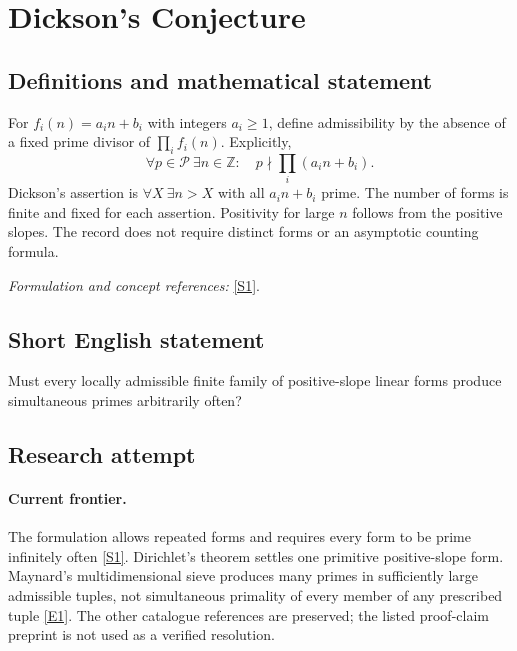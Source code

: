 \documentclass[11pt,a4paper]{article}
\newcommand{\Z}{\mathbb{Z}}
\newcommand{\sref}[2]{\hyperlink{source:#1:#2}{[S#2]}}
\newcommand{\eref}[2]{\hyperlink{extra:#1:#2}{[E#2]}}
\newif\ifshowcatalogue
\newcommand{\cataloguescope}[1]{\ifshowcatalogue
 \paragraph{Exact scope in the supplied catalogue.}
 \begin{quote}\small #1\end{quote}\fi}
\numberwithin{equation}{section}
\begin{document}
\setcounter{section}{0}
\clearpage
\section*{\texorpdfstring{Dickson's Conjecture}{Dickson's Conjecture}}\label{statement}
\subsection{Definitions and mathematical statement}
For $f_i(n)=a_in+b_i$ with integers $a_i\ge1$, define admissibility by the absence of a fixed prime divisor of $\prod_i f_i(n)$. Explicitly,
\[
 \forall p\in\mathcal P\ \exists n\in\Z:\quad p\nmid\prod_i(a_in+b_i).
\]
Dickson's assertion is $\forall X\ \exists n>X$ with all $a_in+b_i$ prime. The number of forms is finite and fixed for each assertion. Positivity for large $n$ follows from the positive slopes. The record does not require distinct forms or an asymptotic counting formula.
\par\smallskip\textit{Formulation and concept references:} \sref{statement}{1}.
\cataloguescope{For every integer k>=1 and every family f\_i(n)=a\_i*n+b\_i (1<=i<=k) with integers a\_i>=1 and b\_i, if for each prime p some integer n has p not dividing the product of the f\_i(n), then infinitely many positive integers n make every f\_i(n) prime.}
\subsection{Short English statement}
Must every locally admissible finite family of positive-slope linear forms produce simultaneous primes arbitrarily often?
\subsection{Research attempt}

\paragraph{Current frontier.}
The formulation allows repeated forms and requires every form to be prime infinitely often \sref{statement}{1}. Dirichlet's theorem settles one primitive positive-slope form. Maynard's multidimensional sieve produces many primes in sufficiently large admissible tuples, not simultaneous primality of every member of any prescribed tuple \eref{statement}{1}. The other catalogue references are preserved; the listed proof-claim preprint is not used as a verified resolution.
\end{document}
